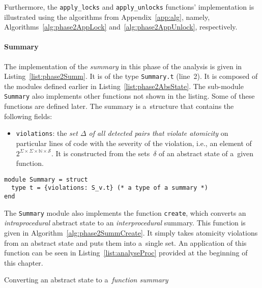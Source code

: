 Furthermore, the \texttt{apply\_locks} and \texttt{apply\_unlocks} functions' implementation is illustrated using the algorithms from Appendix~\ref{app:alg}, namely, Algorithms~\ref{alg:phase2AppLock} and~\ref{alg:phase2AppUnlock}, respectively.

\paragraph{Summary}
The implementation of the \emph{summary} in this phase of the analysis is given in Listing~\ref{list:phase2Summ}. It is of the type \texttt{Summary.t} (line~2). It is composed of the modules defined earlier in Listing~\ref{list:phase2AbsState}. The sub-module \texttt{Summary} also implements other functions not shown in the listing. Some of these functions are defined later. The summary is a~structure that contains the following fields:
\begin{itemize}
    \item \texttt{violations}: the \emph{set $ \Delta $ of all detected pairs that violate atomicity} on particular lines of code with the severity of the violation, i.e., an element of $ 2^{\Sigma \times \Sigma \times \mathbb{N} \times \mathcal{S}} $. It is constructed from the sets~$ \delta $ of an abstract state of a~given function.
\end{itemize}

\begin{lstlisting}[style=ocaml, label={list:phase2Summ}, float=hbt, caption={A~definition of the \emph{summary} in Phase~2}]
module Summary = struct
  type t = {violations: S_v.t} (* a type of a summary *)
end
\end{lstlisting}

The \texttt{Summary} module also implements the function \texttt{create}, which converts an \emph{intraprocedural} abstract state to an \emph{interprocedural} summary. This function is given in Algorithm~\ref{alg:phase2SummCreate}. It simply takes atomicity violations from an abstract state and puts them into a~single set. An application of this function can be seen in Listing~\ref{list:analyseProc} provided at the beginning of this chapter.

\begin{algorithm}[hbt]
%
%
    \caption{Converting an abstract state to a~\emph{function summary}}
    \label{alg:phase2SummCreate}
\end{algorithm}

